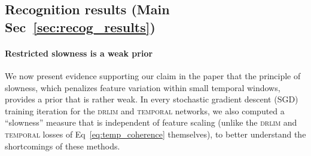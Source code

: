 \documentclass[10pt,twocolumn,letterpaper]{article}
\begin{document}
\begin{table}[t]
  \centering
    \small{
\caption{The ``normalized error'' equivariance measure $\rho_g$ for individual ego-motions (Eq~\eqref{eq:equiv_measure}) on NORB, organized as ``atomic'' (motions in the \textsc{equiv} training set) and ``composite'' (novel) ego-motions.}
\label{tab:equiv_measurement}
}
\end{table}\subsection{Recognition results (Main Sec~\ref{sec:recog_results})}\paragraph{Restricted slowness is a weak prior} We now present evidence supporting our claim in the paper that the principle of slowness, which penalizes feature variation within small temporal windows, provides a prior that is rather weak. In every stochastic gradient descent (SGD) training iteration for the \textsc{drlim} and \textsc{temporal} networks, we also computed a ``slowness'' measure that is independent of feature scaling (unlike the \textsc{drlim} and \textsc{temporal} losses of Eq~\ref{eq:temp_coherence} themselves), to better understand the shortcomings of these methods.
\end{document}
